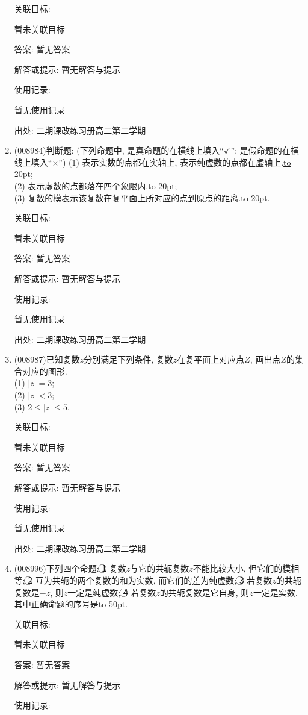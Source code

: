 \documentclass[10pt,a4paper]{article}
\newcommand{\blank}[1]{\underline{\hbox to #1pt{}}}
\begin{document}
\begin{enumerate}[1.]
关联目标:

暂未关联目标

答案: 暂无答案

解答或提示: 暂无解答与提示

使用记录:

暂无使用记录


出处: 二期课改练习册高二第二学期
\item { (008984)}判断题: (下列命题中, 是真命题的在横线上填入``$\checkmark$''; 是假命题的在横线上填入``$\times$'')
(1) 表示实数的点都在实轴上, 表示纯虚数的点都在虚轴上.\blank{20};\\
(2) 表示虚数的点都落在四个象限内.\blank{20};\\
(3) 复数的模表示该复数在复平面上所对应的点到原点的距离.\blank{20}.


关联目标:

暂未关联目标

答案: 暂无答案

解答或提示: 暂无解答与提示

使用记录:

暂无使用记录


出处: 二期课改练习册高二第二学期
\item { (008987)}已知复数$z$分别满足下列条件, 复数$z$在复平面上对应点$Z$, 画出点$Z$的集合对应的图形.\\
(1) $|z|=3$;\\ 
(2) $|z|<3$;\\
(3) $2\le|z|\le 5$.


关联目标:

暂未关联目标

答案: 暂无答案

解答或提示: 暂无解答与提示

使用记录:

暂无使用记录


出处: 二期课改练习册高二第二学期
\item { (008996)}下列四个命题:
\textcircled{1} 复数$z$与它的共轭复数$\overline  z$不能比较大小, 但它们的模相等;
\textcircled{2} 互为共轭的两个复数的和为实数, 而它们的差为纯虚数;
\textcircled{3} 若复数$z$的共轭复数是$-z$, 则$z$一定是纯虚数;
\textcircled{4} 若复数$z$的共轭复数是它自身, 则$z$一定是实数.
其中正确命题的序号是\blank{50}.


关联目标:

暂未关联目标

答案: 暂无答案

解答或提示: 暂无解答与提示

使用记录:


\end{enumerate}
\end{document}
